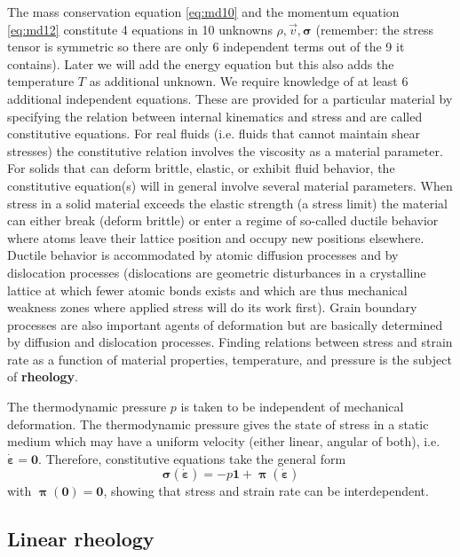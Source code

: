 The mass conservation equation \eqref{eq:md10} and the momentum equation \eqref{eq:md12} constitute 4
equations in 10 unknowns $\rho,\vec{v},{\bm \sigma}$ (remember: the stress tensor is symmetric so there are
only 6 independent terms out of the 9 it contains). 
Later we will add the energy equation but this also
adds the temperature $T$ as additional unknown. We require knowledge of at least 6
additional independent equations. These are provided for a particular material by
specifying the relation between internal kinematics and stress and are called constitutive
equations. For real fluids (i.e. fluids that cannot maintain shear stresses) the constitutive
relation involves the viscosity as a material parameter. For solids that can deform brittle,
elastic, or exhibit fluid behavior, the constitutive equation(s) will in general involve
several material parameters. When stress in a solid material exceeds the elastic strength (a
stress limit) the material can either break (deform brittle) or enter a regime of so-called
ductile behavior where atoms leave their lattice position and occupy new positions
elsewhere. Ductile behavior is accommodated by atomic diffusion processes and by
dislocation processes (dislocations are geometric disturbances in a crystalline lattice at
which fewer atomic bonds exists and which are thus mechanical weakness zones where
applied stress will do its work first). Grain boundary processes are also important agents
of deformation but are basically determined by diffusion and dislocation processes.
Finding relations between stress and strain rate as a function of material properties,
temperature, and pressure is the subject of {\bf rheology}.

The thermodynamic pressure $p$ is taken to be independent of mechanical deformation.
The thermodynamic pressure gives the state of stress in a static medium which may have
a uniform velocity (either linear, angular of both), i.e. $\dot{\bm\varepsilon}={\bm 0}$. 
Therefore, constitutive equations take the general form
\begin{equation}
{\bm \sigma}(\dot{\bm\varepsilon}) = -p {\bm 1} + {\bm \uppi}(\dot{\bm\varepsilon})
\label{eq:md18}
\end{equation}
with ${\bm \uppi}({\bm 0})={\bm 0}$, showing that stress and strain rate can be interdependent.

\subsection{Linear rheology}

